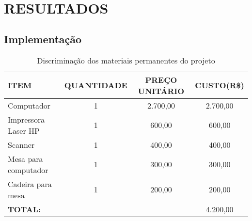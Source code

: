 \chapter{RESULTADOS}
\label{chap:resultados}
\thispagestyle{plain}

\section{Implementação}


\begin{table}[htb]
\begin{center}
    
    \caption[ Discriminação dos materiais permanentes do projeto.
]{ Discriminação dos materiais permanentes do projeto}
    \label{tab-nivinv}
    \begin{tabular} {l|c|c|c}
        \hline
        \textbf{ITEM} & \textbf{QUANTIDADE}  & \textbf{PREÇO UNITÁRIO}  & \textbf{CUSTO(R\$)}  \\
        \hline
        Computador & 1  & 2.700,00 & 2.700,00 \\
        \hline
        Impressora Laser HP & 1  & 600,00 & 600,00 \\
        \hline
        Scanner & 1  & 400,00 & 400,00 \\
        \hline
        Mesa para computador & 1  & 300,00 & 300,00 \\
        \hline
        Cadeira para mesa& 1  & 200,00 & 200,00 \\
         \hline
         \multicolumn{2}{l}{\textbf{TOTAL:}}  & &4.200,00 \\
         \hline
    \end{tabular}
\end{center}
\end{table}


